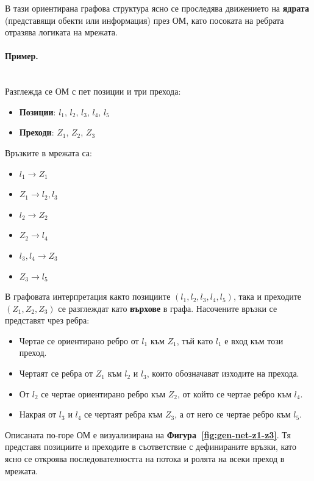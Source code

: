 В тази ориентирана графова структура ясно се проследява движението на \textbf{ядрата} (представящи обекти или информация) през ОМ, като посоката на ребрата отразява логиката на мрежата.

\paragraph{Пример.}
\mbox{}\\
Разглежда се ОМ с пет позиции и три прехода:
\begin{itemize}[nosep]
    \item \textbf{Позиции}: \(l_1\), \(l_2\), \(l_3\), \(l_4\), \(l_5\)
    \item \textbf{Преходи}: \(Z_1\), \(Z_2\), \(Z_3\)
\end{itemize}

Връзките в мрежата са:

\begin{itemize}[nosep]
    \item \(l_1 \rightarrow Z_1\)
    \item \(Z_1 \rightarrow l_2, l_3\)
    \item \(l_2 \rightarrow Z_2\)
    \item \(Z_2 \rightarrow l_4\)
    \item \(l_3, l_4 \rightarrow Z_3\)
    \item \(Z_3 \rightarrow l_5\)
\end{itemize}

В графовата интерпретация както позициите \((l_1, l_2, l_3, l_4, l_5)\), така и преходите \((Z_1, Z_2, Z_3)\) се разглеждат като \textbf{върхове} в графа. Насочените връзки се представят чрез ребра:

\begin{itemize}[nosep]
    \item Чертае се ориентирано ребро от \(l_1\) към \(Z_1\), тъй като \(l_1\) е вход към този преход.
    \item Чертаят се ребра от \(Z_1\) към \(l_2\) и \(l_3\), които обозначават изходите на прехода.
    \item От \(l_2\) се чертае ориентирано ребро към \(Z_2\), от който се чертае ребро към \(l_4\).
    \item Накрая от \(l_3\) и \(l_4\) се чертаят ребра към \(Z_3\), а от него се чертае ребро към \(l_5\).
\end{itemize}

Описаната по-горе ОМ е визуализирана на \textbf{Фигура~\ref{fig:gen-net-z1-z3}}. Тя представя позициите и преходите в съответствие с дефинираните връзки, като ясно се откроява последователността на потока и ролята на всеки преход в мрежата.

